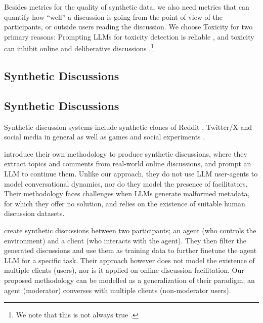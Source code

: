 Besides metrics for the quality of synthetic data, we also need metrics that can quantify how ``well'' a discussion is going from the point of view of the participants, or outside users reading the discussion. We choose Toxicity for two primary reasons: Prompting \acp{LLM} for toxicity detection is reliable \citep{kang-qian-2024-implanting, Wang2022ToxicityDW, anjum2024hate}, and toxicity can inhibit online and deliberative discussions \citep{dekock2022disagree, XiaToxicity}.\footnote{We note that this is not always true \citep{Avalle2024PersistentIP}.} 


\subsection{Synthetic Discussions}
\subsection{Synthetic Discussions}
\label{ssec:related:discussions}


Synthetic discussion systems 
include synthetic clones of Reddit \cite{park_simulacra}, Twitter/X \cite{mou_2024} and social media in general \cite{tornberg_2023, y_social} as well as games \cite{Park2023GenerativeAI} and social experiments \cite{zhou_2024_sotopia}.

\citet{balog_2024} introduce their own methodology to produce synthetic discussions, where they extract topics and comments from real-world online discussions, and prompt an \ac{LLM} to continue them. Unlike our approach, they do not use \ac{LLM} user-agents to model conversational dynamics, nor do they model the presence of facilitators. Their methodology faces challenges when \acp{LLM} generate malformed metadata, for which they offer no solution, and relies on the existence of suitable human discussion datasets.

\citet{ulmer2024} create synthetic discussions between two participants; an agent (who controls the environment) and a client (who interacts with the agent). They then filter the generated discussions and use them as training data to further finetune the agent \ac{LLM} for a specific task. Their approach however does not model the existence of multiple clients (users), nor is it applied on online discussion facilitation. Our proposed methodology can be modelled as a generalization of their paradigm; an agent (moderator) converses with multiple clients (non-moderator users).

